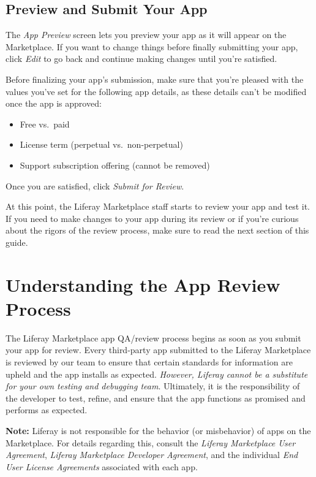 \subsection{Preview and Submit Your
App}\label{preview-and-submit-your-app}

The \emph{App Preview} screen lets you preview your app as it will
appear on the Marketplace. If you want to change things before finally
submitting your app, click \emph{Edit} to go back and continue making
changes until you're satisfied.

Before finalizing your app's submission, make sure that you're pleased
with the values you've set for the following app details, as these
details can't be modified once the app is approved:

\begin{itemize}
\tightlist
\item
  Free vs.~paid
\item
  License term (perpetual vs.~non-perpetual)
\item
  Support subscription offering (cannot be removed)
\end{itemize}

Once you are satisfied, click \emph{Submit for Review}.

At this point, the Liferay Marketplace staff starts to review your app
and test it. If you need to make changes to your app during its review
or if you're curious about the rigors of the review process, make sure
to read the next section of this guide.

\section{Understanding the App Review
Process}\label{understanding-the-app-review-process}

The Liferay Marketplace app QA/review process begins as soon as you
submit your app for review. Every third-party app submitted to the
Liferay Marketplace is reviewed by our team to ensure that certain
standards for information are upheld and the app installs as expected.
\emph{However, Liferay cannot be a substitute for your own testing and
debugging team}. Ultimately, it is the responsibility of the developer
to test, refine, and ensure that the app functions as promised and
performs as expected.

\noindent\hrulefill 

\textbf{Note:} Liferay is not responsible for the behavior (or
misbehavior) of apps on the Marketplace. For details regarding this,
consult the \emph{Liferay Marketplace User Agreement}, \emph{Liferay
Marketplace Developer Agreement}, and the individual \emph{End User
License Agreements} associated with each app. 

